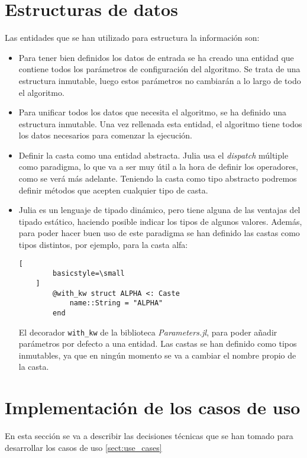 \section{Estructuras de datos}

Las entidades que se han utilizado para estructura la información son:
\begin{itemize}
    \item Para tener bien definidos los datos de entrada se ha creado una entidad que contiene todos los parámetros de
    configuración del algoritmo. Se trata de una estructura inmutable, luego estos parámetros no cambiarán a lo largo de todo el
    algoritmo.
    \item Para unificar todos los datos que necesita el algoritmo, se ha definido una estructura inmutable. Una vez
    rellenada esta entidad, el algoritmo tiene todos los datos necesarios para comenzar la ejecución.
    \item Definir la casta como una entidad abstracta. Julia usa el \emph{dispatch} múltiple como paradigma, 
    lo que va a ser muy útil a la hora de definir los operadores, como se verá más adelante. Teniendo la casta 
    como tipo abstracto podremos definir métodos que acepten cualquier tipo de casta.

    \item Julia es un lenguaje de tipado dinámico, pero tiene alguna de las ventajas del tipado estático, haciendo posible indicar
    los tipos de algunos valores. Además, para poder hacer buen uso de este paradigma se han definido las castas como tipos distintos, por ejemplo, para
    la casta alfa:

    \begin{lstlisting}[
        basicstyle=\small
    ]
        @with_kw struct ALPHA <: Caste
            name::String = "ALPHA"
        end
    \end{lstlisting}

    El decorador \lstinline{with_kw} de la biblioteca \emph{Parameters.jl}, para poder añadir parámetros por defecto a una entidad. Las castas se han definido 
    como tipos inmutables, ya que en ningún momento se va a cambiar el nombre propio de la casta.
\end{itemize}

\section{Implementación de los casos de uso}

En esta sección se va a describir las decisiones técnicas que se han tomado para desarrollar los casos de uso \ref{sect:use_cases}

